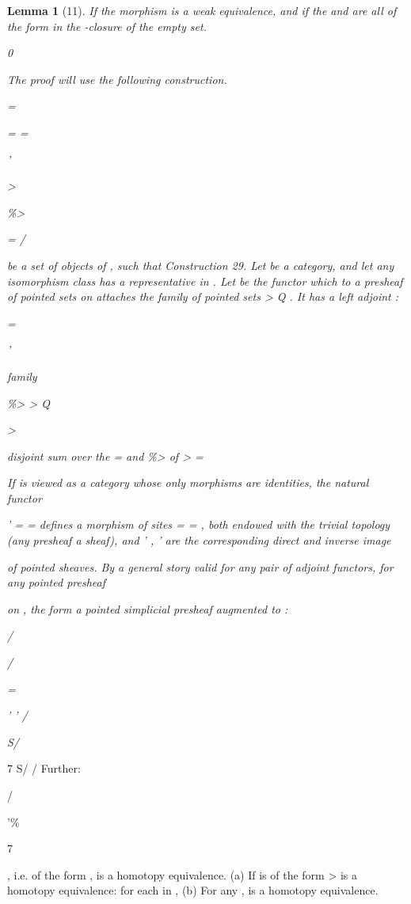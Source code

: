 \documentclass[11pt,a4paper]{article}
\theoremstyle{plain}
\newtheorem{lemma}[theorem]{Lemma}
\theoremstyle{definition}
\begin{document}
\begin{lemma}[11]
If the morphism
is a weak equivalence, and if the  and  are all of the form
in the  -closure of the empty set.

0



The proof will use the following construction.

=

=
=

'

 > 

\%> 

=
/

be a set of objects of , such that
Construction 29. Let be a category, and let
any isomorphism class has a representative in . Let be the functor which to a
presheaf of pointed sets on attaches the family of pointed sets
> Q . It has
a left adjoint :

=

'

family

\%> > Q 





>

disjoint sum over the   = and \%>   of > 
=

If
is viewed as a category whose only morphisms are identities, the natural
functor

' = =
defines a morphism of sites =
= , both endowed with the trivial topology
(any presheaf a sheaf), and ' , ' are the corresponding direct and inverse image

of pointed sheaves.
By a general story valid for any pair of adjoint functors, for any pointed presheaf
 
on , the
form a pointed simplicial presheaf
augmented
to :

/

/

=

' '  / 

S/ 

\end{lemma}

7 S/  /
Further:

/

'\%



 7

, i.e. of the form
, is a homotopy equivalence.
(a) If is of the form
>
is a homotopy equivalence: for each
in ,
(b) For any ,
is a homotopy equivalence.
\end{document}
